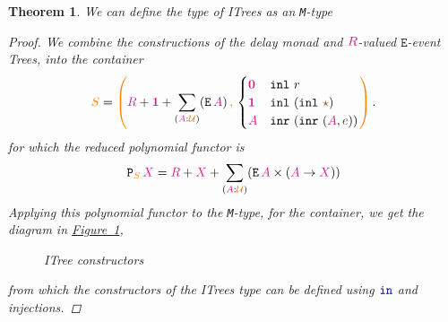 \documentclass[twoside,11pt,openright]{report}
\theoremstyle{plain} %
\newtheorem{thm}{Theorem}[section]
\theoremstyle{definition}
\theoremstyle{remark}
\newcommand*{\figref}[1]{\hyperref[fig:#1]{Figure~\ref*{fig:#1}}}
\newcommand*{\term}[1]{\textcolor{green!30!black}{#1}} %
\newcommand*{\type}[1]{\textcolor{magenta!90!black}{#1}}
\newcommand*{\container}[1]{\textcolor{orange}{#1}}
\newcommand*{\containerpair}[2]{\ensuremath{\colorlet{savedleftcolor}{.}\color{orange}\left(\color{savedleftcolor}#1\,\textcolor{orange}{\mathbf{,}}\,#2\color{orange}\right)\color{savedleftcolor}}}
\newcommand*{\universe}[1]{\textcolor{orange!80!black}{#1}}
\newcommand*{\unit}{\type{\textbf{1}}}
\newcommand*{\empt}{\type{\textbf{0}}}
\newcommand*{\constant}[1]{\textcolor{orange!60!black}{\ensuremath{\mathtt{#1}}}}
\newcommand*{\function}[1]{\textcolor{blue!60!black}{\ensuremath{\mathtt{#1}}}}
\newcommand*{\constructor}[1]{\textcolor{purple!60!black}{\ensuremath{\mathtt{#1}}}}
\newcommand*{\typeformer}[1]{\ensuremath{\mathtt{#1}}}
\newcommand*{\functor}[1]{\ensuremath{\mathbf{\mathtt{#1}}}}
\newcommand*{\unitelem}{\constant{\star}} %
\begin{document}
\begin{thm}
  We can define the type of ITrees as an \texttt{M}-type
  \begin{proof}
    We combine the constructions of the delay monad and \(\type{R}\)-valued \(\typeformer{E}\)-event Trees, into the container
    \begin{equation}
      \container{S} = \containerpair{\type{R}+\unit+\sum_{(\type{A}:\universe{\mathcal{U}})} (\typeformer{E}\,\type{A})}{\begin{cases} \empt & \texttt{inl}~r \\ \unit & \texttt{inl}~(\texttt{inl}~\unitelem) \\ \type{A} & \texttt{inr}~(\texttt{inr}~(\type{A},\term{e})) \end{cases}}.
    \end{equation}
    \noindent for which the reduced polynomial functor is
    \begin{equation}
      \functor{P}_{\container{S}}\,\type{X} = \type{R} + \type{X} + \sum_{(\type{A} : \universe{\mathcal{U}})} (\typeformer{E}\,\type{A} \times (\type{A} \rightarrow \type{X}))
    \end{equation}
    Applying this polynomial functor to the \texttt{M}-type, for the container, we get the diagram in \figref{ITree-constructors},
    \begin{figure}[h]
      \centering
      \caption{ITree constructors}
      \label{fig:ITree-constructors}
    \end{figure}
    from which the constructors of the ITrees type can be defined using \(\function{in}\) and injections.
  \end{proof}
\end{thm}
\end{document}
